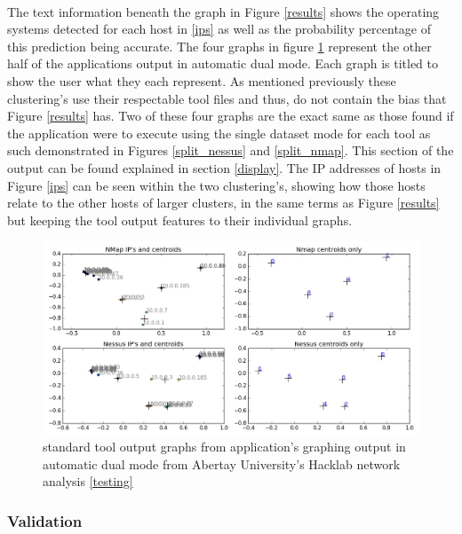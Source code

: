 \paragraph{}The text information beneath the graph in Figure \ref{results} shows the operating systems detected for each host in \ref{ips} as well as the probability percentage of this prediction being accurate. The four graphs in figure \ref{results2} represent the other half of the applications output in automatic dual mode. Each graph is titled to show the user what they each represent. As mentioned previously these clustering's use their respectable tool files and thus, do not contain the bias that Figure \ref{results} has. Two of these four graphs are the exact same as those found if the application were to execute using the single dataset mode for each tool as such demonstrated in Figures \ref{split_nessus} and \ref{split_nmap}. This section of the output can be found explained in section \ref{display}. The IP addresses of hosts in Figure \ref{ips} can be seen within the two clustering's, showing how those hosts relate to the other hosts of larger clusters, in the same terms as Figure \ref{results} but keeping the tool output features to their individual graphs.

\begin{figure}[!h]
\centering
\includegraphics[width=6in]{./Figures/results2.png}
\caption{standard tool output graphs from application's graphing output in automatic dual mode from Abertay University's Hacklab network analysis \ref{testing}}
\label{results2}
\end{figure}

\subsubsection{Validation}

